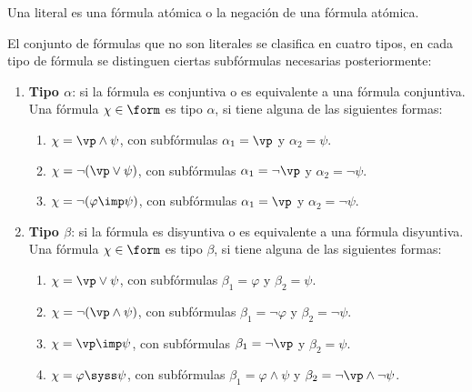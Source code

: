\documentclass[11pt,letterpaper]{article}
\begin{document}
\begin{definicion}
  Una literal es una fórmula atómica o la negación de una fórmula atómica.
\end{definicion}

\begin{definicion} El conjunto de fórmulas que no son literales se clasifica en
 cuatro tipos, en cada tipo de fórmula se distinguen ciertas
 subfórmulas necesarias posteriormente:
 \begin{enumerate}
  \item[] \textbf{Tipo $\alpha$}: si la fórmula es conjuntiva o es equivalente
   a una fórmula conjuntiva. \\
   Una fórmula $\chi \in \form$ es tipo $\alpha$, si tiene alguna de las
   siguientes formas:
   \begin{enumerate} 
   \item  $\chi = \vp \land \psi$, con subfórmulas $\alpha_{1} = \vp$ y
     $\alpha_{2} = \psi$.

   \item  $\chi = \lnot(\vp \lor \psi)$, con subfórmulas 
   $\alpha_{1} = \lnot \vp$ y  $\alpha_{2} = \lnot \psi$.

   \item   $\chi = \lnot(\varphi \imp \psi)$, con subfórmulas  
   $\alpha_{1} = \vp$ y  $\alpha_{2} = \lnot \psi$.
   \end{enumerate}

  \item[] \textbf{Tipo $\beta$}: si la fórmula es disyuntiva o es equivalente
   a una fórmula disyuntiva. \\
   Una fórmula $\chi \in \form$ es tipo $\beta$, si tiene alguna de las
   siguientes formas:
   \begin{enumerate}
   \item  $\chi = \vp \lor \psi$, con subfórmulas $\beta_{1} = \varphi$ y
    $\beta_{2} = \psi$.

   \item $\chi = \lnot(\vp \land \psi)$, con subfórmulas  
    $\beta_{1} = \lnot \varphi$ y $\beta_{2} = \lnot \psi$.

   \item $\chi = \vp \imp \psi$, con subfórmulas $\beta_{1} = \lnot \vp$
    y $\beta_{2} = \psi$.

   \item $\chi = \varphi \syss \psi$, con subfórmulas 
   $\beta_{1} = \varphi \land \psi$ y $\beta_{2} = \lnot \vp \land \lnot \psi$.


\end{enumerate}
\end{enumerate}
\end{definicion}
\end{document}
